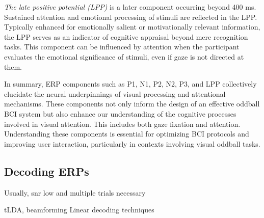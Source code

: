 \emph{The late positive potential (LPP)} is a later component occurring beyond 400 ms.
Sustained attention and emotional processing of stimuli are reflected in the
LPP.
Typically enhanced for emotionally salient or motivationally relevant
information, the LPP serves as an indicator of cognitive appraisal beyond mere
recognition tasks.
This component can be influenced by attention when the participant evaluates
the emotional significance of stimuli, even if gaze is not directed at them.

In summary, ERP components such as P1, N1, P2, N2, P3, and LPP collectively
elucidate the neural underpinnings of visual processing and attentional
mechanisms.
These components not only inform the design of an effective oddball BCI system
but also enhance our understanding of the cognitive processes involved in visual
attention.
This includes both gaze fixation and attention.
Understanding these components is essential for optimizing BCI protocols and
improving user interaction, particularly in contexts involving visual oddball
tasks.

\subsection{Decoding ERPs}

Usually, snr low and multiple trials necessary

tLDA, beamforming
Linear decoding techniques
